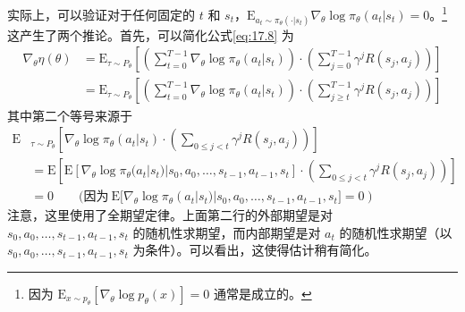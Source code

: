 实际上，可以验证对于任何固定的 $t$ 和 $s_t$，$\mathrm{E}_{a_t \sim \pi_\theta(\cdot|s_t)} \nabla_\theta \log \pi_\theta(a_t|s_t) = 0$。\footnote{因为 $\mathrm{E}_{x \sim p_\theta} [\nabla_\theta \log p_\theta(x)] = 0$ 通常是成立的。} 这产生了两个推论。首先，可以简化公式\eqref{eq:17.8} 为
\begin{align}
    \nabla_\theta \eta(\theta) &= \mathrm{E}_{\tau \sim P_\theta} \left[ \left( \sum_{t=0}^{T-1} \nabla_\theta \log \pi_\theta(a_t|s_t) \right) \cdot \left( \sum_{j=0}^{T-1} \gamma^j R(s_j, a_j) \right) \right] \nonumber \\
    &= \mathrm{E}_{\tau \sim P_\theta} \left[ \left( \sum_{t=0}^{T-1} \nabla_\theta \log \pi_\theta(a_t|s_t) \right) \cdot \left( \sum_{j \ge t}^{T-1} \gamma^j R(s_j, a_j) \right) \right] \label{eq:17.10}
\end{align}
其中第二个等号来源于
\begin{align*}
    \mathrm{E}&_{\tau \sim P_\theta} \left[ \nabla_\theta \log \pi_\theta(a_t|s_t) \cdot \left( \sum_{0 \le j < t} \gamma^j R(s_j, a_j) \right) \right] \\
    &=\mathrm{E} \left[ \mathrm{E} \left[ \nabla_\theta \log \pi_\theta(a_t|s_t) | s_0, a_0, \dots, s_{t-1}, a_{t-1}, s_t \right] \cdot \left( \sum_{0 \le j < t} \gamma^j R(s_j, a_j) \right) \right]\\
    &= 0 \qquad (\text{因为}\ \mathrm{E} [\nabla_\theta \log \pi_\theta(a_t|s_t) | s_0, a_0, \dots, s_{t-1}, a_{t-1}, s_t] = 0)
\end{align*}
注意，这里使用了全期望定律。上面第二行的外部期望是对 $s_0, a_0, \dots, s_{t-1}, a_{t-1}, s_t$ 的随机性求期望，而内部期望是对 $a_t$ 的随机性求期望（以 $s_0, a_0, \dots, s_{t-1}, a_{t-1}, s_t$ 为条件）。可以看出，这使得估计稍有简化。

